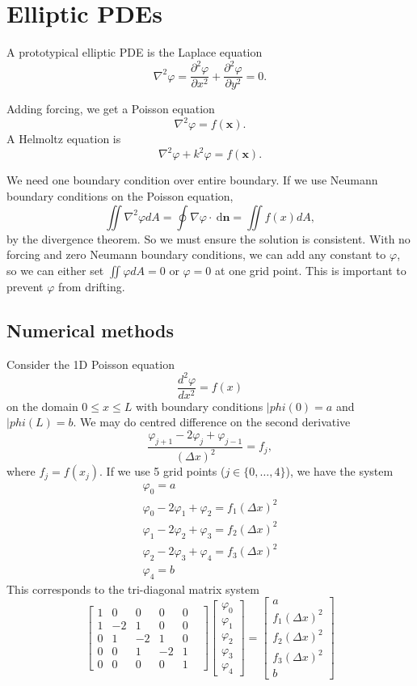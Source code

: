 \documentclass[11pt, a4paper]{article}
\renewcommand{\phi}{\varphi}
\theoremstyle{break}
\newcommand*{\set}[1]{\{#1\}}%
\newcommand{\ve}{\mathbf} %
\newcommand{\dx}{\Delta x}
\newcommand{\pder}[3][2]{\frac{\partial^#1 #2}{\partial #3^#1}}
\newcommand{\ddder}[3][2]{\frac{d^#1 #2}{d #3^#1}}
\newcommand{\dd}{\ \mathrm{d}}
\newcommand{\lap}{\nabla^2}
\begin{document}
\section{Elliptic PDEs}A prototypical elliptic PDE is the Laplace equation \[\lap\phi= \pder\phi x + \pder \phi y=0.\]

Adding forcing, we get a  Poisson equation \[\lap\phi = f(\ve x).\] A Helmoltz equation is \[\lap\phi+k^2\phi = f(\ve x).\]

We need one boundary condition over entire boundary. If we use Neumann boundary conditions on the Poisson equation, \[\iint\lap\phi dA=\oint \nabla\phi\cdot \dd\ve n=\iint f(x)dA,\] by the divergence theorem. So we must ensure the solution is consistent. With no forcing and zero Neumann boundary conditions, we can add any constant to $\phi$, so we can either set $\iint\phi dA=0$ or $\phi=0$ at one grid point. This is important to prevent $\phi$ from drifting.
\subsection{Numerical methods}
Consider the 1D Poisson equation \[\ddder\phi x=f(x)\] on the domain $0\leq x\leq L$ with boundary conditions $|phi(0)=a$ and $|phi(L)=b$. We may do centred difference on the second derivative \[\frac{\phi_{j+1}-2\phi_j+\phi_{j-1}}{(\dx)^2}=f_j,\] where $f_j=f(x_j)$. If we use 5 grid points ($j\in\set{0,\ldots,4}$), we have the system \begin{align*}
	\phi_0=a\\
	\phi_0-2\phi_1+\phi_2 =f_1(\dx)^2\\
	\phi_1-2\phi_2+\phi_3 = f_2(\dx)^2\\
	\phi_2-2\phi_3+\phi_4 = f_3(\dx)^2\\
	\phi_4=b
\end{align*}
This corresponds to the tri-diagonal matrix system \begin{equation*}
	\begin{bmatrix}
		1&0&0&0&0&\\1&-2&1&0&0\\0&1&-2&1&0\\0&0&1&-2&1\\0&0&0&0&1
	\end{bmatrix}\begin{bmatrix}
	\phi_0\\\phi_1\\\phi_2\\\phi_3\\\phi_4
	\end{bmatrix}
	=\begin{bmatrix}
		a\\f_1(\dx)^2\\f_2(\dx)^2\\f_3(\dx)^2\\b
	\end{bmatrix}
\end{equation*}
\end{document}
